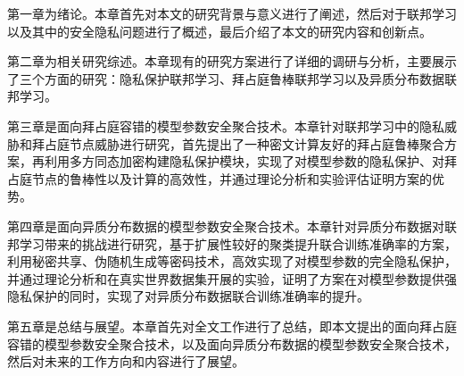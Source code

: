 第一章为绪论。本章首先对本文的研究背景与意义进行了阐述，然后对于联邦学习以及其中的安全隐私问题进行了概述，最后介绍了本文的研究内容和创新点。

第二章为相关研究综述。本章现有的研究方案进行了详细的调研与分析，主要展示了三个方面的研究：隐私保护联邦学习、拜占庭鲁棒联邦学习以及异质分布数据联邦学习。

第三章是面向拜占庭容错的模型参数安全聚合技术。本章针对联邦学习中的隐私威胁和拜占庭节点威胁进行研究，首先提出了一种密文计算友好的拜占庭鲁棒聚合方案，再利用多方同态加密构建隐私保护模块，实现了对模型参数的隐私保护、对拜占庭节点的鲁棒性以及计算的高效性，并通过理论分析和实验评估证明方案的优势。

第四章是面向异质分布数据的模型参数安全聚合技术。本章针对异质分布数据对联邦学习带来的挑战进行研究，基于扩展性较好的聚类提升联合训练准确率的方案，利用秘密共享、伪随机生成等密码技术，高效实现了对模型参数的完全隐私保护，并通过理论分析和在真实世界数据集开展的实验，证明了方案在对模型参数提供强隐私保护的同时，实现了对异质分布数据联合训练准确率的提升。

第五章是总结与展望。本章首先对全文工作进行了总结，即本文提出的面向拜占庭容错的模型参数安全聚合技术，以及面向异质分布数据的模型参数安全聚合技术，然后对未来的工作方向和内容进行了展望。
